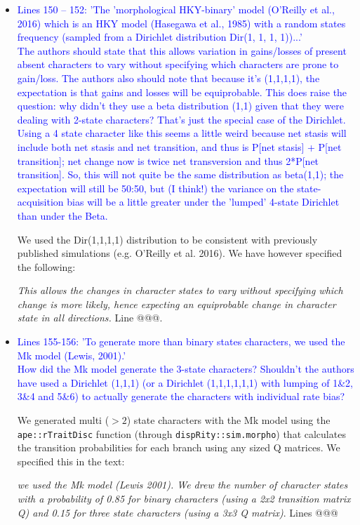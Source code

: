\documentclass[12pt,letterpaper]{article}
\begin{document}
\begin{itemize}
\item{\textcolor{blue}{Lines 150 – 152: 'The 'morphological HKY-binary' model (O'Reilly et al.,
2016) which is an HKY model (Hasegawa et al., 1985) with a random states frequency (sampled from a Dirichlet distribution Dir(1, 1, 1, 1))...'
\\
The authors should state that this allows variation in gains/losses of present absent characters to vary without specifying which characters are prone to gain/loss. The authors also should note that because it's (1,1,1,1), the expectation is that gains and losses will be equiprobable. This does raise the question: why didn't they use a beta distribution (1,1) given that they were dealing with 2-state characters? That's just the special case of the Dirichlet. Using a 4 state character like this seems a little weird because net stasis will include both net stasis and net transition, and thus is P[net stasis] + P[net transition]; net change now is twice net transversion and thus 2*P[net transition]. So, this will not quite be the same distribution as beta(1,1); the expectation will still be 50:50, but (I think!) the variance on the state-acquisition bias will be a little greater under the 'lumped' 4-state Dirichlet than under the Beta.}}

We used the Dir(1,1,1,1) distribution to be consistent with previously published simulations (e.g. O'Reilly et al. 2016).
We have however specified the following:

\textit{This allows the changes in character states to vary without specifying which change is more likely, hence expecting an equiprobable change in character state in all directions.} Line @@@.



\item{\textcolor{blue}{Lines 155-156: 'To generate more than binary states characters, we used the Mk model (Lewis, 2001).'
\\
How did the Mk model generate the 3-state characters? Shouldn't the authors have used a Dirichlet (1,1,1) (or a Dirichlet (1,1,1,1,1,1) with lumping of 1\&2, 3\&4 and 5\&6) to actually generate the characters with individual rate bias?}}

We generated multi ($>2$) state characters with the Mk model using the \texttt{ape::rTraitDisc} function (through \texttt{dispRity::sim.morpho}) that calculates the transition probabilities for each branch using any sized Q matrices. We specified this in the text:

\textit{we used the Mk model (Lewis 2001). We drew the number of character states with a probability of 0.85 for binary characters (using a 2x2 transition matrix Q) and 0.15 for three state characters (using a 3x3 Q matrix)}. Lines @@@




\end{itemize}
\end{document}
